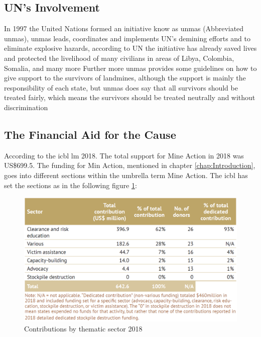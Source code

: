 \subsection{UN's Involvement}

In 1997 the United Nations formed an initiative know as \gls{unmas} (Abbreviated \gls{unmas}), \gls{unmas} leads, coordinates and implements UN's demining efforts and to eliminate explosive hazards, according to UN the initiative has already saved lives and protected the livelihood of many civilians in areas of Libya, Colombia, Somalia, and many more
Further more \gls{unmas} provides some guidelines on how to give support to the survivors of landmines, although the support is mainly the responsibility of each state, but \gls{unmas} does say that all survivors should be treated fairly, which means the survivors should be treated neutrally and without discrimination

\subsection{The Financial Aid for the Cause}

According to the \gls{icbl} \gls{lm} 2018. The total support for Mine Action in 2018 was US\$699.5. The funding for Min Action, mentioned in chapter \ref{chap:Introduction}, goes into different sections within the umbrella term Mine Action. The \gls{icbl} has set the sections as in the following figure \ref{fig:contributions_by_thematic_sector_2018}:

\begin{figure}[ht]
  \centering
  \includegraphics[width=0.6\linewidth]{00 - Images/contributions_by_thematic_sector_2018.png}
  \caption{Contributions by thematic sector 2018 \cite{LandmineMonitor2019}}
  \label{fig:contributions_by_thematic_sector_2018}
\end{figure}

